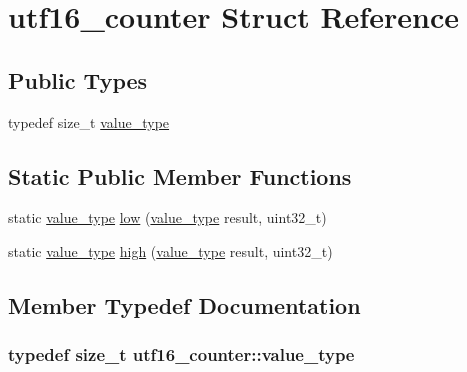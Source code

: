 \hypertarget{structutf16__counter}{
\section{utf16\_\-counter Struct Reference}
\label{structutf16__counter}
}
\subsection*{Public Types}
\begin{DoxyCompactItemize}
\item 
typedef size\_\-t \hyperlink{structutf16__counter_a0d63f9ca809d182b2f184ef93bd11107}{value\_\-type}
\end{DoxyCompactItemize}
\subsection*{Static Public Member Functions}
\begin{DoxyCompactItemize}
\item 
static \hyperlink{structutf16__counter_a0d63f9ca809d182b2f184ef93bd11107}{value\_\-type} \hyperlink{structutf16__counter_a4571f3d0fbf0ce763904ec3321dcb41e}{low} (\hyperlink{structutf16__counter_a0d63f9ca809d182b2f184ef93bd11107}{value\_\-type} result, uint32\_\-t)
\item 
static \hyperlink{structutf16__counter_a0d63f9ca809d182b2f184ef93bd11107}{value\_\-type} \hyperlink{structutf16__counter_ac1a8793996e57dc28fd22f3165628e4d}{high} (\hyperlink{structutf16__counter_a0d63f9ca809d182b2f184ef93bd11107}{value\_\-type} result, uint32\_\-t)
\end{DoxyCompactItemize}


\subsection{Member Typedef Documentation}
\hypertarget{structutf16__counter_a0d63f9ca809d182b2f184ef93bd11107}{
\subsubsection[{value\_\-type}]{\setlength{\rightskip}{0pt plus 5cm}typedef size\_\-t {\bf utf16\_\-counter::value\_\-type}}}
\label{structutf16__counter_a0d63f9ca809d182b2f184ef93bd11107}


